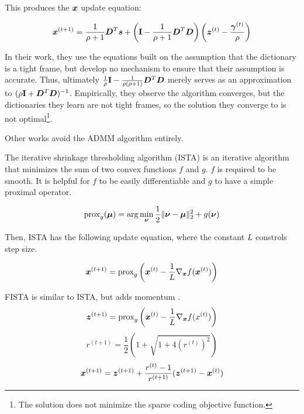 This produces the $\bm{x}$ update equation:

\begin{equation}
\bm{x}^{(t + 1)} = \frac{1}{\rho + 1}\bm{D}^T\bm{s} + \left({\bf I} - \frac{1}{\rho + 1}\bm{D}^T\bm{D}\right)\left(\bm{z}^{(t)} - \frac{\bm{\gamma}^{(t)}}{\rho}\right)
\end{equation}

In their work, they use the equations built on the assumption that the dictionary is a tight frame, but develop no mechanism to ensure that their assumption is accurate. Thus, ultimately $\frac{1}{\rho}{\bf I} - \frac{1}{\rho(\rho + 1)}\bm{D}^T\bm{D}$ merely serves as an approximation to $(\rho{\bf I} + \bm{D}^T\bm{D})^{-1}$. Empirically, they observe the algorithm converges, but the dictionaries they learn are not tight frames, so the solution they converge to is not optimal\footnote{The solution does not minimize the sparse coding objective function.}.

Other works avoid the ADMM algorithm entirely.

The iterative shrinkage thresholding algorithm (ISTA) is an iterative algorithm that minimizes the sum of two convex functions $f$ and $g$. $f$ is required to be smooth. It is helpful for $f$ to be easily differentiable and $g$ to have a simple proximal operator.

\begin{equation}
\operatorname{prox}_g(\bm{\mu}) = \arg \min_{\bm{\nu}} \frac{1}{2}\|\bm{\nu} - \bm{\mu}\|_2^2 + g(\bm{\nu})
\end{equation}

Then, ISTA has the following update equation, where the constant $L$ constrols step size.

\begin{equation}
\bm{x}^{(t + 1)} = \operatorname{prox}_g\left(\bm{x}^{(t)} - \frac{1}{L}\nabla_{\bm{x}} f(\bm{x}^{(t)})\right)
\end{equation}

FISTA is similar to ISTA, but adds momentum \cite{beck2009fast}.
\begin{equation}
\bm{z}^{(t + 1)} = \operatorname{prox}_g\left(\bm{x}^{(t)} - \frac{1}{L}\nabla_{\bm{x}}f(x^{(t)})\right)
\end{equation}
\begin{equation}
r^{(t + 1)} = \frac{1}{2}\left(1 + \sqrt{1 + 4(r^{(t)})^2}\right)
\end{equation}
\begin{equation}
\bm{x}^{(t + 1)} = \bm{z}^{(t + 1)} + \frac{r^{(t)} - 1}{r^{(t + 1)}}(\bm{z}^{(t + 1)} - \bm{x}^{(t)})
\end{equation}

